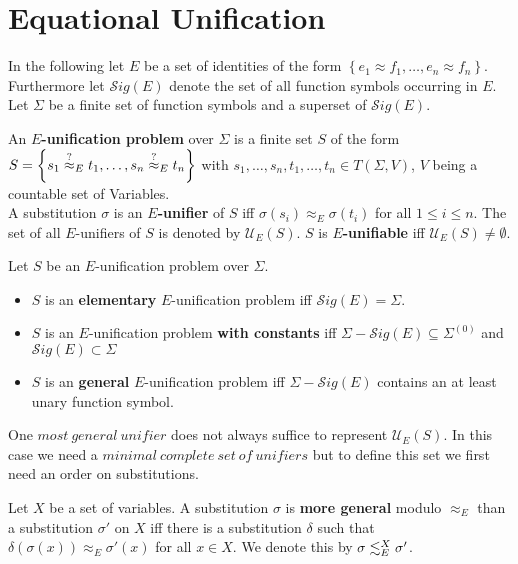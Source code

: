 \section{Equational Unification}
In the following let $E$ be a set of identities of the form $\left\lbrace  e_1\approx f_1,\dots,e_n\approx f_n \right\rbrace$. Furthermore let $\mathcal{S}ig(E)$ denote the set of all function symbols occurring in $E$. Let $\Sigma$ be a finite set of function symbols and a superset of $\mathcal{S}ig(E)$.
\begin{definition}
	An \textbf{$E$-unification problem} over $\Sigma$ is a finite set $S$ of the form $S=\left\lbrace s_1\stackrel{?}{\approx}_{E} t_1,\dots,s_n\stackrel{?}{\approx}_{E} t_n\right\rbrace $ with $s_1,\dots,s_n,t_1,\dots,t_n \in T(\Sigma,V)$, $V$ being a countable set of Variables.\\
	A substitution $\sigma$ is an \textbf{$E$-unifier} of $S$ iff $ \sigma(s_i)\approx_E \sigma(t_i)$ for all $1\leq i \leq n$.
	The set of all $E$-unifiers of $S$ is denoted by $\mathcal{U}_E(S)$. $S$ is \textbf{$E$-unifiable} iff $\mathcal{U}_E(S)\neq \emptyset$.
\end{definition}
\begin{definition}
	Let $S$ be an $E$-unification problem over $\Sigma$.
	\begin{itemize}
		\item $S$ is an \textbf{elementary} $E$-unification problem iff $\mathcal{S}ig(E)=\Sigma$.
		\item $S$ is an $E$-unification problem \textbf{with constants} iff $\Sigma-\mathcal{S}ig(E)\subseteq\Sigma^{(0)}$ and $\mathcal{S}ig(E)\subset\Sigma$
		\item $S$ is an \textbf{general} $E$-unification problem iff $\Sigma-\mathcal{S}ig(E)$ contains an at least unary function symbol.
	\end{itemize}
\end{definition}
One $most\ general\ unifier$ does not always suffice to represent $\mathcal{U}_E(S)$. In this case we need a $minimal\ complete\ set\ of\ unifiers$ but to define this set we first need an order on substitutions.
\begin{definition}
	Let $X$ be a set of variables. A substitution $\sigma$ is \textbf{more general} modulo $\approx_E$ than a substitution $\sigma'$ on $X$ iff there is a substitution $\delta$ such that $\delta(\sigma(x))\approx_E\sigma'(x)$ for all $x \in X$. We denote this by $\sigma\lesssim^X_E\sigma'$.
\end{definition}
